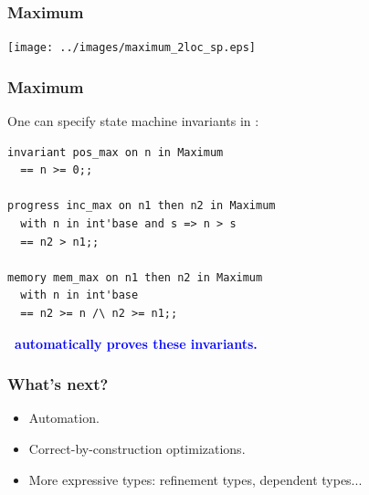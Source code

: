 \documentclass[12pt,red]{beamer}
\newcommand{\cemph}[1]{\textcolor{blue}{\textbf{#1}}}
\begin{document}
\begin{frame}[fragile]
  \frametitle{Maximum}

  \begin{center}
    \texttt{[image: ../images/maximum\_2loc\_sp.eps]}
  \end{center}
\end{frame}


\begin{frame}[fragile]
  \frametitle{Maximum}

One can specify state machine invariants in \eml:
\begin{lstlisting}[basicstyle=\small]
invariant pos_max on n in Maximum
  == n >= 0;;

progress inc_max on n1 then n2 in Maximum
  with n in int'base and s => n > s
  == n2 > n1;;

memory mem_max on n1 then n2 in Maximum
  with n in int'base
  == n2 >= n /\ n2 >= n1;;
\end{lstlisting}

\vspace{0.1in}

\cemph{\nuprl\ automatically proves these invariants.}
\end{frame}


\begin{frame}
  \frametitle{What's next?}

  \begin{itemize}
  \item Automation.

    \vspace{0.2in}

  \item Correct-by-construction optimizations.

    \vspace{0.2in}

  \item More expressive types: refinement types, dependent types...
  \end{itemize}
\end{frame}
\end{document}
